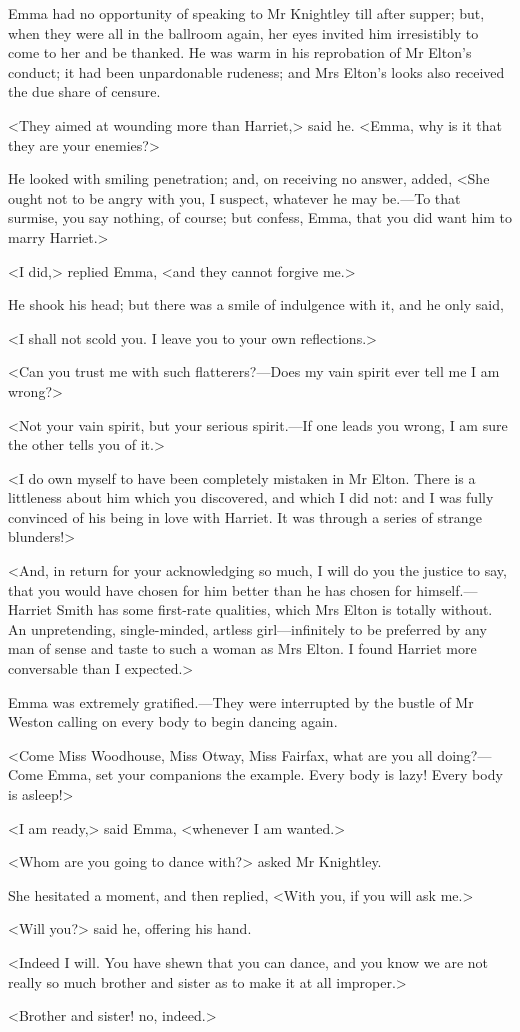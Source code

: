 Emma had no opportunity of speaking to Mr Knightley till after supper; but, when they were all in the ballroom again, her eyes invited him irresistibly to come to her and be thanked. He was warm in his reprobation of Mr Elton's conduct; it had been unpardonable rudeness; and Mrs Elton's looks also received the due share of censure.

<They aimed at wounding more than Harriet,> said he. <Emma, why is it that they are your enemies?>

He looked with smiling penetration; and, on receiving no answer, added, <She ought not to be angry with you, I suspect, whatever he may be.—To that surmise, you say nothing, of course; but confess, Emma, that you did want him to marry Harriet.>

<I did,> replied Emma, <and they cannot forgive me.>

He shook his head; but there was a smile of indulgence with it, and he only said,

<I shall not scold you. I leave you to your own reflections.>

<Can you trust me with such flatterers?—Does my vain spirit ever tell me I am wrong?>

<Not your vain spirit, but your serious spirit.—If one leads you wrong, I am sure the other tells you of it.>

<I do own myself to have been completely mistaken in Mr Elton. There is a littleness about him which you discovered, and which I did not: and I was fully convinced of his being in love with Harriet. It was through a series of strange blunders!>

<And, in return for your acknowledging so much, I will do you the justice to say, that you would have chosen for him better than he has chosen for himself.—Harriet Smith has some first-rate qualities, which Mrs Elton is totally without. An unpretending, single-minded, artless girl—infinitely to be preferred by any man of sense and taste to such a woman as Mrs Elton. I found Harriet more conversable than I expected.>

Emma was extremely gratified.—They were interrupted by the bustle of Mr Weston calling on every body to begin dancing again.

<Come Miss Woodhouse, Miss Otway, Miss Fairfax, what are you all doing?—Come Emma, set your companions the example. Every body is lazy! Every body is asleep!>

<I am ready,> said Emma, <whenever I am wanted.>

<Whom are you going to dance with?> asked Mr Knightley.

She hesitated a moment, and then replied, <With you, if you will ask me.>

<Will you?> said he, offering his hand.

<Indeed I will. You have shewn that you can dance, and you know we are not really so much brother and sister as to make it at all improper.>

<Brother and sister! no, indeed.>